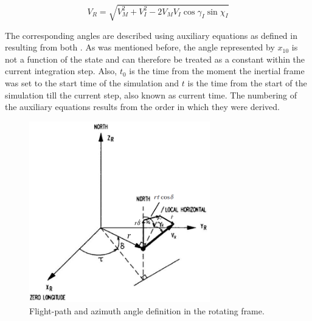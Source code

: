 \begin{equation} \label{eq:inVelToRotVel}
V_{R} = \sqrt{V_{M}^{2}+V_{I}^{2}-2V_{M}V_{I} \cos\gamma_{I} \sin\chi_{I}}
\end{equation} 
 
The corresponding angles are described using auxiliary equations as defined in  resulting from both . As was mentioned before, the angle represented by $x_{10}$ is not a function of the state and can therefore be treated as a constant within the current integration step. Also, $t_{0}$ is the time from the moment the inertial frame was set to the start time of the simulation and $t$ is the time from the start of the simulation till the current step, also known as current time. The numbering of the auxiliary equations results from the order in which they were derived.

 \begin{figure}[!ht]
\centering
\includegraphics[width=0.7\textwidth]{figures/tsi/flight_path_and_azimuth_angle.png}
\caption{Flight-path and azimuth angle definition in the rotating frame.}
\label{fig:flight_path_and_azimuth_angle}
\end{figure}
 

